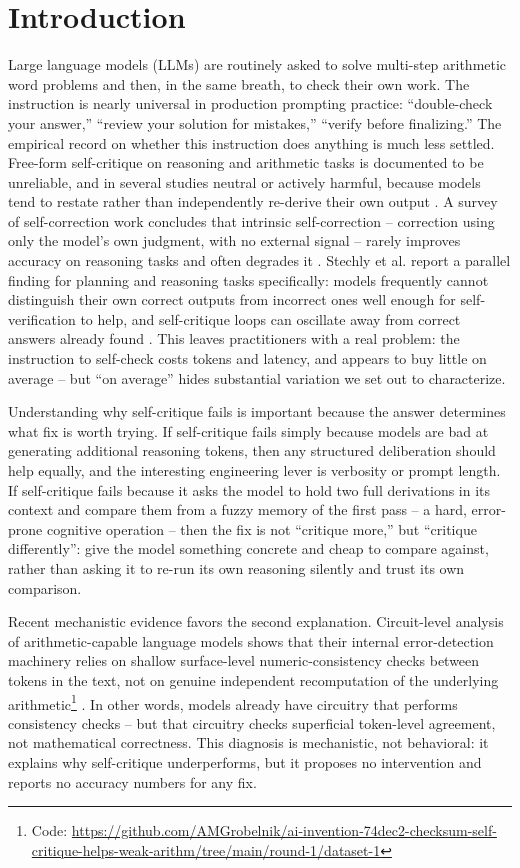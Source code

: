 \documentclass[11pt,letterpaper]{article}
\begin{document}
\section{Introduction}

Large language models (LLMs) are routinely asked to solve multi-step arithmetic word problems and then, in the same breath, to check their own work. The instruction is nearly universal in production prompting practice: ``double-check your answer,'' ``review your solution for mistakes,'' ``verify before finalizing.'' The empirical record on whether this instruction does anything is much less settled. Free-form self-critique on reasoning and arithmetic tasks is documented to be unreliable, and in several studies neutral or actively harmful, because models tend to restate rather than independently re-derive their own output \citep{Madaan2023,Huang2023,Kamoi2024,Stechly2024}. A survey of self-correction work concludes that intrinsic self-correction -- correction using only the model's own judgment, with no external signal -- rarely improves accuracy on reasoning tasks and often degrades it \citep{Kamoi2024}. Stechly et al. report a parallel finding for planning and reasoning tasks specifically: models frequently cannot distinguish their own correct outputs from incorrect ones well enough for self-verification to help, and self-critique loops can oscillate away from correct answers already found \citep{Stechly2024}. This leaves practitioners with a real problem: the instruction to self-check costs tokens and latency, and appears to buy little on average -- but ``on average'' hides substantial variation we set out to characterize.

Understanding why self-critique fails is important because the answer determines what fix is worth trying. If self-critique fails simply because models are bad at generating additional reasoning tokens, then any structured deliberation should help equally, and the interesting engineering lever is verbosity or prompt length. If self-critique fails because it asks the model to hold two full derivations in its context and compare them from a fuzzy memory of the first pass -- a hard, error-prone cognitive operation -- then the fix is not ``critique more,'' but ``critique differently'': give the model something concrete and cheap to compare against, rather than asking it to re-run its own reasoning silently and trust its own comparison.

Recent mechanistic evidence favors the second explanation. Circuit-level analysis of arithmetic-capable language models shows that their internal error-detection machinery relies on shallow surface-level numeric-consistency checks between tokens in the text, not on genuine independent recomputation of the underlying arithmetic\footnote{Code: \url{https://github.com/AMGrobelnik/ai-invention-74dec2-checksum-self-critique-helps-weak-arithm/tree/main/round-1/dataset-1}} \citep{Bertolazzi2025}. In other words, models already have circuitry that performs consistency checks -- but that circuitry checks superficial token-level agreement, not mathematical correctness. This diagnosis is mechanistic, not behavioral: it explains why self-critique underperforms, but it proposes no intervention and reports no accuracy numbers for any fix.
\end{document}
